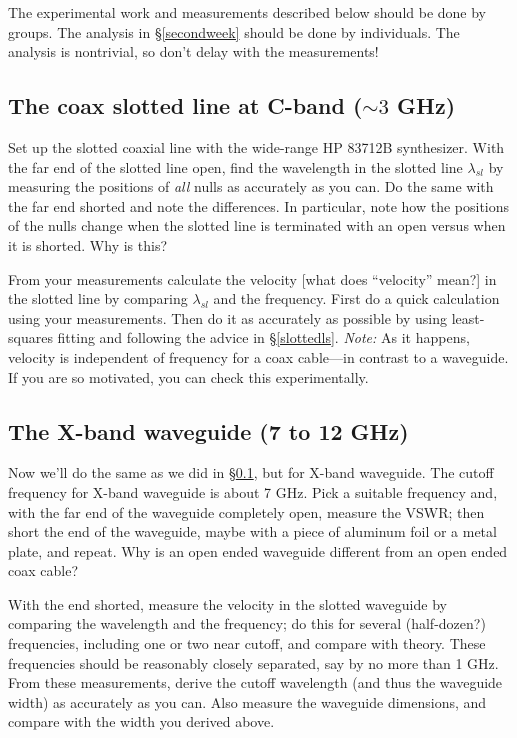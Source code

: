 \documentclass[11pt,preprint]{aastex}
\begin{document}
The experimental work and measurements described below should
be done by groups.  The analysis in \S \ref{secondweek} should be done
by individuals. The analysis is nontrivial, so don't delay with the
measurements!


\subsection {The coax slotted line at C-band ($\sim 3$ GHz)} \label{slotted}

\noindent
Set up the slotted coaxial line with the wide-range HP 83712B
synthesizer.  With the far end of the slotted line open, find the
wavelength in the slotted line $\lambda_{sl}$ by measuring the positions
of {\it all} nulls as accurately as you can.  Do the same with the far
end shorted and note the differences.  In particular, note how the
positions of the nulls change when the slotted line is terminated with
an open versus when it is shorted.  Why is this?

From your measurements calculate the velocity [what does ``velocity''
  mean?] in the slotted line by comparing $\lambda_{sl}$ and the
frequency.  First do a quick calculation using your measurements. Then
do it as accurately as possible by using least-squares fitting and
following the advice in \S \ref{slottedls}.  {\it Note:} As it happens,
velocity is independent of frequency for a coax cable---in contrast
to a waveguide.  If you are so motivated, you can check this
experimentally.

\subsection {The X-band waveguide (7 to 12 GHz)} \label{waveguide}

\noindent
Now we'll do the same as we did in \S \ref{slotted}, but for X-band
waveguide.  The cutoff frequency for X-band waveguide is about 7
GHz. Pick a suitable frequency and, with the far end of the waveguide
completely open, measure the VSWR; then short the end of the waveguide,
maybe with a piece of aluminum foil or a metal plate, and repeat.  Why
is an open ended waveguide different from an open ended coax cable?

With the end shorted, measure the velocity in the slotted waveguide by
comparing the wavelength and the frequency; do this for several
(half-dozen?) frequencies, including one or two near cutoff, and compare
with theory.  These frequencies should be reasonably closely separated,
say by no more than 1 GHz.  From these measurements, derive the cutoff
wavelength (and thus the waveguide width) as accurately as you can.
Also measure the waveguide dimensions, and compare 
with the width you derived above.
\end{document}
